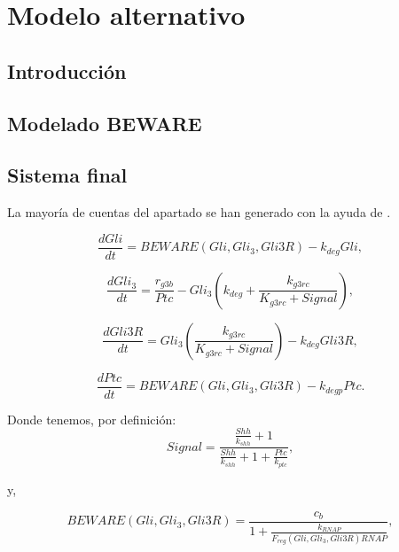 \chapter{Modelo alternativo}

\label{ch:modelo_alternativo}

\section{Introducción}

\section{Modelado BEWARE}






\section{Sistema final}

La mayoría de cuentas del apartado se han generado con la ayuda de \cite{sympy}.

\begin{equation}
\frac{dGli}{dt} = BEWARE(Gli, Gli_3, Gli3R)-k_{deg}Gli,
\label{eq:1}
\end{equation}

\begin{equation}
\frac{dGli_3}{dt} = \frac{r_{g3b}}{Ptc}-Gli_3\left(k_{deg}+\frac{k_{g3rc}}{K_{g3rc}+Signal}\right),
\label{eq:2}
\end{equation}

\begin{equation}
\frac{dGli3R}{dt}= Gli_3\left(\frac{k_{g3rc}}{K_{g3rc}+Signal}\right)-k_{deg}Gli3R,
\label{eq:3}
\end{equation}

\begin{equation}
\frac{dPtc}{dt} = BEWARE(Gli, Gli_3, Gli3R)-k_{degp}Ptc.
\label{eq:4}
\end{equation}


Donde tenemos, por definición:
 \begin{equation}
Signal=\frac{\frac{Shh}{k_{shh}} + 1}{\frac{Shh}{k_{shh}} + 1 + \frac{Ptc}{k_{ptc}}},
\label{signal} \end{equation}

y,


\begin{equation}
BEWARE(Gli, Gli_3, Gli3R)=\frac{c_{b}}{1 + \frac{k_{RNAP}}{F_{reg}(Gli, Gli_3, Gli3R) RNAP}},
\end{equation}

